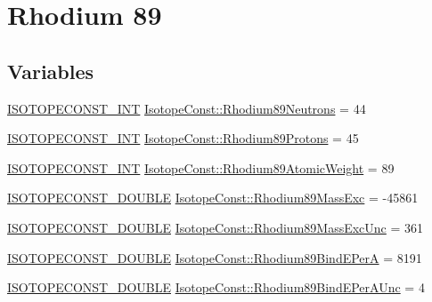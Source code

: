 \hypertarget{group___isotope_const-_rhodium-_rh89}{}\section{Rhodium 89}
\label{group___isotope_const-_rhodium-_rh89}
\subsection*{Variables}
\begin{DoxyCompactItemize}
\item 
\mbox{\hyperlink{group___isotope_const-_macros_ga5f18360b3e99483a35c32d789e62621c}{I\+S\+O\+T\+O\+P\+E\+C\+O\+N\+S\+T\+\_\+\+I\+NT}} \mbox{\hyperlink{group___isotope_const-_rhodium-_rh89_ga371991bca52267aa603cca4fd4834552}{Isotope\+Const\+::\+Rhodium89\+Neutrons}} = 44
\item 
\mbox{\hyperlink{group___isotope_const-_macros_ga5f18360b3e99483a35c32d789e62621c}{I\+S\+O\+T\+O\+P\+E\+C\+O\+N\+S\+T\+\_\+\+I\+NT}} \mbox{\hyperlink{group___isotope_const-_rhodium-_rh89_gad79c40cbd8231acfe2f0334d941d60ba}{Isotope\+Const\+::\+Rhodium89\+Protons}} = 45
\item 
\mbox{\hyperlink{group___isotope_const-_macros_ga5f18360b3e99483a35c32d789e62621c}{I\+S\+O\+T\+O\+P\+E\+C\+O\+N\+S\+T\+\_\+\+I\+NT}} \mbox{\hyperlink{group___isotope_const-_rhodium-_rh89_ga739f8b05bee0ba901ec628769b974f02}{Isotope\+Const\+::\+Rhodium89\+Atomic\+Weight}} = 89
\item 
\mbox{\hyperlink{group___isotope_const-_macros_ga8f45a7272ce02c0b4c65c44636ed719a}{I\+S\+O\+T\+O\+P\+E\+C\+O\+N\+S\+T\+\_\+\+D\+O\+U\+B\+LE}} \mbox{\hyperlink{group___isotope_const-_rhodium-_rh89_ga5a792ad03fce75ab68fc78d57894080e}{Isotope\+Const\+::\+Rhodium89\+Mass\+Exc}} = -\/45861
\item 
\mbox{\hyperlink{group___isotope_const-_macros_ga8f45a7272ce02c0b4c65c44636ed719a}{I\+S\+O\+T\+O\+P\+E\+C\+O\+N\+S\+T\+\_\+\+D\+O\+U\+B\+LE}} \mbox{\hyperlink{group___isotope_const-_rhodium-_rh89_ga6642818d046084611f345e6316874e8c}{Isotope\+Const\+::\+Rhodium89\+Mass\+Exc\+Unc}} = 361
\item 
\mbox{\hyperlink{group___isotope_const-_macros_ga8f45a7272ce02c0b4c65c44636ed719a}{I\+S\+O\+T\+O\+P\+E\+C\+O\+N\+S\+T\+\_\+\+D\+O\+U\+B\+LE}} \mbox{\hyperlink{group___isotope_const-_rhodium-_rh89_ga6b69c510761202360de8bf5d3eef2753}{Isotope\+Const\+::\+Rhodium89\+Bind\+E\+PerA}} = 8191
\item 
\mbox{\hyperlink{group___isotope_const-_macros_ga8f45a7272ce02c0b4c65c44636ed719a}{I\+S\+O\+T\+O\+P\+E\+C\+O\+N\+S\+T\+\_\+\+D\+O\+U\+B\+LE}} \mbox{\hyperlink{group___isotope_const-_rhodium-_rh89_gac68d51716374b2ae3fed0b68ab6a40f0}{Isotope\+Const\+::\+Rhodium89\+Bind\+E\+Per\+A\+Unc}} = 4

\end{DoxyCompactItemize}
